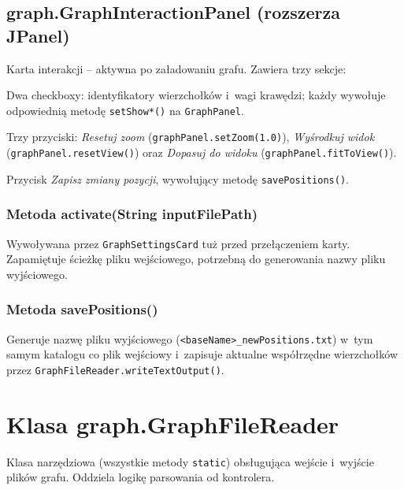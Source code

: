 \documentclass[12pt]{article}
\begin{document}
\subsection{graph.GraphInteractionPanel (rozszerza JPanel)}

Karta interakcji -- aktywna po załadowaniu grafu. Zawiera trzy sekcje:

\begin{description}[leftmargin=3.5cm, style=nextline]
    \item[Wyświetlanie] Dwa checkboxy: identyfikatory wierzchołków i~wagi
         krawędzi; każdy wywołuje odpowiednią metodę \texttt{setShow*()}
         na \texttt{GraphPanel}.
    \item[Widok] Trzy przyciski: \emph{Resetuj zoom}
         (\texttt{graphPanel.setZoom(1.0)}), \emph{Wyśrodkuj widok}
         (\texttt{graphPanel.resetView()}) oraz \emph{Dopasuj do widoku}
         (\texttt{graphPanel.fitToView()}).
    \item[Eksport] Przycisk \emph{Zapisz zmiany pozycji}, wywołujący
         metodę \texttt{savePositions()}.
\end{description}

\subsubsection{Metoda activate(String inputFilePath)}

Wywoływana przez \texttt{GraphSettingsCard} tuż przed przełączeniem karty.
Zapamiętuje ścieżkę pliku wejściowego, potrzebną do generowania nazwy
pliku wyjściowego.

\subsubsection{Metoda savePositions()}

Generuje nazwę pliku wyjściowego (\texttt{<baseName>\_newPositions.txt})
w~tym samym katalogu co plik wejściowy i~zapisuje aktualne współrzędne
wierzchołków przez \texttt{GraphFileReader.writeTextOutput()}.

\section{Klasa graph.GraphFileReader}

Klasa narzędziowa (wszystkie metody \texttt{static}) obsługująca wejście
i~wyjście plików grafu. Oddziela logikę parsowania od kontrolera.
\end{document}
